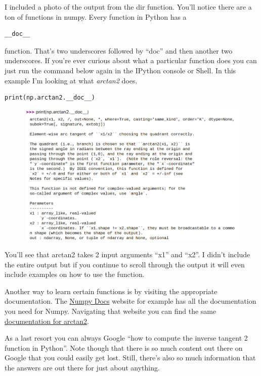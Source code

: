 I included a photo of the output from the dir function. You’ll notice
there are a ton of functions in numpy. Every function in Python has a
\begin{verbatim} 
__doc__
\end{verbatim}

function. That’s two underscores followed by “doc” and then
another two underscores. If you’re ever curious about what a
particular function does you can just run the command below again in
the IPython console or Shell. In this example I’m looking at what
{\it arctan2} does.  

\begin{verbatim}
print(np.arctan2.__doc__)
\end{verbatim}

\begin{figure}[H]
  \begin{center}
    \includegraphics[width=\textwidth]{Figures/arctan2_doc.png}
  \end{center}
\end{figure}

You’ll see that arctan2 takes 2 input arguments “x1” and “x2”. I
didn’t include the entire output but if you continue to scroll through
the output it will even include examples on how to use the function.  

Another way to learn certain functions is by visiting the appropriate
documentation. The \href{https://numpy.org/doc/}{Numpy Docs} website
for example has all the documentation you need for Numpy. Navigating
that website you can find the same \href{https://numpy.org/doc/1.19/reference/generated/numpy.arctan2.html?highlight=arctan2#numpy.arctan2}{documentation for arctan2}.

As a last resort you can always Google “how to compute the inverse
tangent 2 function in Python”. Note though that there is so much
content out there on Google that you could easily get lost. Still,
there’s also so much information that the answers are out there for
just about anything.  

